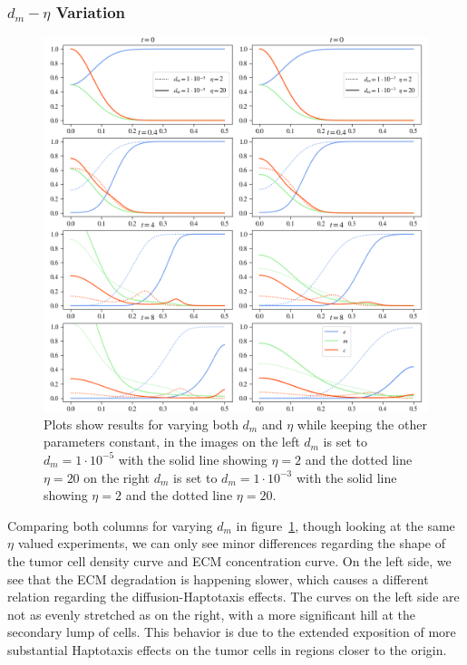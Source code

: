 \subsubsection*{$d_m - \eta$ Variation}
\begin{figure}[h!]
 \centering
 \includegraphics[width=\textwidth]{resources/images/dm_eta_variation.png}
 \caption{Plots show results for varying both $d_m$ and $\eta$ while keeping the other parameters constant, in the images on the left $d_m$ is set to $d_m=1\cdot 10^{-5}$ with the solid line showing $\eta = 2$ and the dotted line $\eta=20$ on the right $d_m$ is set to $d_m=1\cdot 10^{-3}$ with the solid line showing $\eta = 2$ and the dotted line $\eta=20$.}
 \label{fig:dm_eta_variation}
\end{figure}

Comparing both columns for varying $d_m$ in figure~\ref{fig:dm_eta_variation}, though looking at the same $\eta$ valued experiments, we can only see minor differences regarding the shape of the tumor cell density curve and ECM concentration curve. On the left side, we see that the ECM degradation is happening slower, which causes a different relation regarding the diffusion-Haptotaxis effects. The curves on the left side are not as evenly stretched as on the right, with a more significant hill at the secondary lump of cells. This behavior is due to the extended exposition of more substantial Haptotaxis effects on the tumor cells in regions closer to the origin. 

